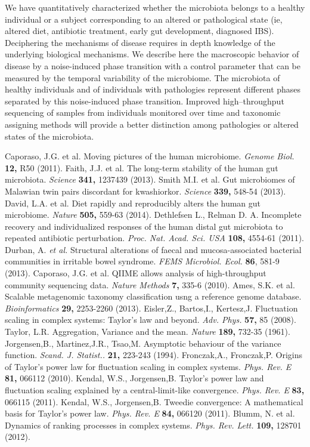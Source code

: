 \documentclass[11pt,oneside,letterpaper]{article}
\begin{document}
We have quantitatively characterized whether the microbiota belongs to a healthy individual or a subject corresponding to an altered or pathological state (ie, altered diet, antibiotic treatment, early gut development, diagnosed IBS). Deciphering the mechanisms of disease requires in depth knowledge of the underlying biological mechanisms. We describe here the macroscopic behavior of disease by a noise-induced phase transition with a control parameter that can be measured by the temporal variability of the microbiome. The microbiota of healthy individuals and of individuals with pathologies represent different phases separated by this noise-induced phase transition. Improved high--throughput sequencing of samples from individuals monitored over time and taxonomic assigning methods will provide a better distinction among pathologies or altered states of the microbiota. 


\begin{thebibliography}{1}
 Caporaso, J.G. et al. Moving pictures of the human microbiome. {\it Genome Biol.} {\bf 12,} R50 (2011).
 Faith, J.J. et al. The long-term stability of the human gut microbiota. {\it Science} {\bf 341,} 1237439 (2013).
 Smith M.I. et al. Gut microbiomes of Malawian twin pairs discordant for kwashiorkor. {\it Science} {\bf 339,} 548-54 (2013).
 David, L.A. et al. Diet rapidly and reproducibly alters the human gut microbiome. {\it Nature} {\bf 505,} 559-63 (2014).
 Dethlefsen L., Relman D. A. Incomplete recovery and individualized responses of the human distal gut microbiota to repeated antibiotic perturbation. {\it Proc. Nat. Acad. Sci. USA} {\bf 108,} 4554-61 (2011).
 Durban, A. \textit{et al.} Structural alterations of faecal and mucosa-associated bacterial communities in irritable bowel syndrome. {\it FEMS Microbiol. Ecol.} {\bf 86}, 581-9 (2013).
 Caporaso, J.G. et al. QIIME allows analysis of high-throughput community sequencing data. {\it Nature Methods} {\bf 7,} 335-6 (2010).
 Ames, S.K. et al. Scalable metagenomic taxonomy classification usng a reference genome database. {\it Bioinformatics} {\bf 29,} 2253-2260 (2013).
 Eisler,Z., Bartos,I., Kertesz,J. Fluctuation scaling in complex systems: Taylor's law and beyond. {\it Adv. Phys.} {\bf 57,} 85 (2008).
 Taylor, L.R. Aggregation, Variance and the mean. {\it Nature} {\bf 189,} 732-35 (1961).
 Jorgensen,B., Martinez,J.R., Tsao,M. Asymptotic behaviour of the variance function. {\it Scand. J. Statist..} {\bf 21,} 223-243 (1994).
 Fronczak,A., Fronczak,P. Origins of Taylor's power law for fluctuation scaling in complex systems. {\it Phys. Rev. E} {\bf 81,} 066112 (2010).
 Kendal, W.S., Jorgensen,B. Taylor's power law and fluctuation scaling explained by a central-limit-like convergence. {\it Phys. Rev. E} {\bf 83,} 066115 (2011).
 Kendal, W.S., Jorgensen,B. Tweedie convergence: A mathematical basis for Taylor's power law. {\it Phys. Rev. E} {\bf 84,} 066120 (2011).
 Blumm, N. et al. Dynamics of ranking processes in complex systems. {\it Phys. Rev. Lett.} {\bf 109,} 128701 (2012).
\end{thebibliography}
\end{document}
